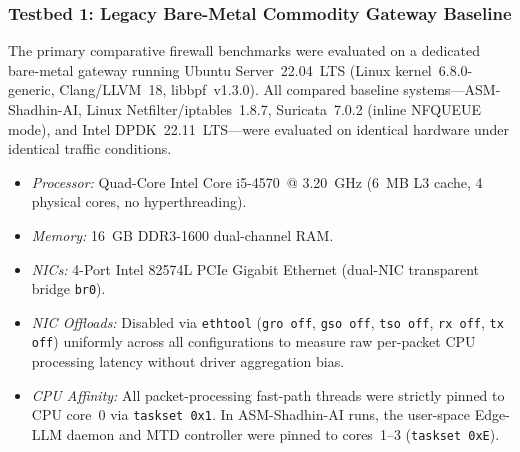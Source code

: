 \documentclass{ieeeaccess}
\renewcommand{\_}{\textunderscore\allowbreak}
\begin{document}
\subsubsection{Testbed 1: Legacy Bare-Metal Commodity Gateway Baseline}
The primary comparative firewall benchmarks were evaluated on a dedicated bare-metal gateway running Ubuntu Server~22.04~LTS (Linux kernel~6.8.0-generic, Clang/LLVM~18, libbpf~v1.3.0). All compared baseline systems---ASM-Shadhin-AI, Linux Netfilter/iptables~1.8.7, Suricata~7.0.2 (inline NFQUEUE mode), and Intel DPDK~22.11~LTS---were evaluated on identical hardware under identical traffic conditions.
\begin{itemize}
  \item \textit{Processor:} Quad-Core Intel Core i5-4570~@ 3.20~GHz (6~MB L3 cache, 4 physical cores, no hyperthreading).
  \item \textit{Memory:} 16~GB DDR3-1600 dual-channel RAM.
  \item \textit{NICs:} 4-Port Intel 82574L PCIe Gigabit Ethernet (dual-NIC transparent bridge \texttt{br0}).
  \item \textit{NIC Offloads:} Disabled via \texttt{ethtool} (\texttt{gro off}, \texttt{gso off}, \texttt{tso off}, \texttt{rx off}, \texttt{tx off}) uniformly across all configurations to measure raw per-packet CPU processing latency without driver aggregation bias.
  \item \textit{CPU Affinity:} All packet-processing fast-path threads were strictly pinned to CPU core~0 via \texttt{taskset~0x1}. In ASM-Shadhin-AI runs, the user-space Edge-LLM daemon and MTD controller were pinned to cores~1--3 (\texttt{taskset~0xE}).
\end{itemize}
\end{document}
